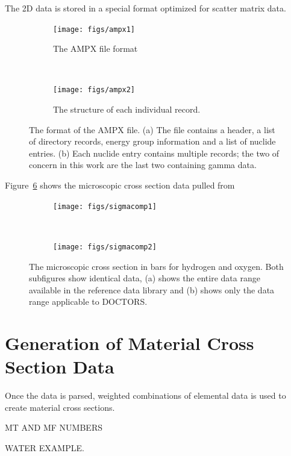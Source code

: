 The 2D data is stored in a special format optimized for scatter matrix data.

\begin{figure}
    \centering
    \begin{subfigure}[b]{0.45\textwidth}
        \texttt{[image: figs/ampx1]}
        \caption{The AMPX file format}
        \label{fig:ampx1}
    \end{subfigure}
    ~
    \begin{subfigure}[b]{0.45\textwidth}
        \texttt{[image: figs/ampx2]}
        \caption{The structure of each individual record.}
        \label{fig:ampx2}
    \end{subfigure}
    \caption{The format of the AMPX file. (a) The file contains a header, a list of directory records, energy group information and a list of nuclide entries. (b) Each nuclide entry contains multiple records; the two of concern in this work are the last two containing gamma data.}\label{fig:ampx}
\end{figure}

Figure~\ref{fig:sigmacomp} shows the microscopic cross section data pulled from 

\begin{figure}
    \centering
    \begin{subfigure}[b]{0.45\textwidth}
        \texttt{[image: figs/sigmacomp1]}
        \caption{}
        \label{fig:ampx1}
    \end{subfigure}
    ~
    \begin{subfigure}[b]{0.45\textwidth}
        \texttt{[image: figs/sigmacomp2]}
        \caption{}
        \label{fig:ampx2}
    \end{subfigure}
    \caption{The microscopic cross section in bars for hydrogen and oxygen. Both subfigures show identical data, (a) shows the entire data range available in the reference data library and (b) shows only the data range applicable to DOCTORS.}\label{fig:sigmacomp}
\end{figure}

\section{Generation of Material Cross Section Data}\label{sec:xsgen}

Once the data is parsed, weighted combinations of elemental data is used to create material cross sections.

MT AND MF NUMBERS

WATER EXAMPLE.

